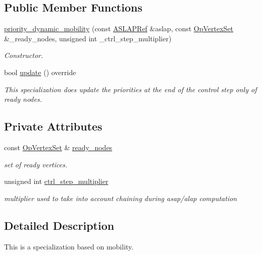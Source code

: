 \subsection*{Public Member Functions}
\begin{DoxyCompactItemize}
\item 
\hyperlink{structpriority__dynamic__mobility_a9e5d4c33fc7de37bdd7e1fc8adc23eb8}{priority\+\_\+dynamic\+\_\+mobility} (const \hyperlink{ASLAP_8hpp_afa0405547acd1806b9bd3e5d03beb045}{A\+S\+L\+A\+P\+Ref} \&aslap, const \hyperlink{classOpVertexSet}{Op\+Vertex\+Set} \&\+\_\+ready\+\_\+nodes, unsigned int \+\_\+ctrl\+\_\+step\+\_\+multiplier)
\begin{DoxyCompactList}\small\item\em Constructor. \end{DoxyCompactList}\item 
bool \hyperlink{structpriority__dynamic__mobility_ab736af2d0bd541a8e53e37835900b061}{update} () override
\begin{DoxyCompactList}\small\item\em This specialization does update the priorities at the end of the control step only of ready nodes. \end{DoxyCompactList}\end{DoxyCompactItemize}
\subsection*{Private Attributes}
\begin{DoxyCompactItemize}
\item 
const \hyperlink{classOpVertexSet}{Op\+Vertex\+Set} \& \hyperlink{structpriority__dynamic__mobility_a574e2c82969dbb0a3de2b19f5488c37e}{ready\+\_\+nodes}
\begin{DoxyCompactList}\small\item\em set of ready vertices. \end{DoxyCompactList}\item 
unsigned int \hyperlink{structpriority__dynamic__mobility_a71a4bfc266df1f5ab01e0eea02568ce1}{ctrl\+\_\+step\+\_\+multiplier}
\begin{DoxyCompactList}\small\item\em multiplier used to take into account chaining during asap/alap computation \end{DoxyCompactList}\end{DoxyCompactItemize}


\subsection{Detailed Description}
This is a specialization based on mobility. 

